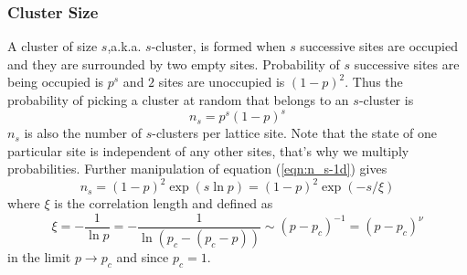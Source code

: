 		\subsubsection{Cluster Size}
		A cluster of size $s$,a.k.a. $s$-cluster, is formed when $s$ successive sites are occupied and they are surrounded by two empty sites. Probability of $s$ successive sites are being occupied is $p^s$ and $2$ sites are unoccupied is $(1-p)^2$. Thus the probability of picking a cluster at random that belongs to an $s$-cluster is
		\begin{equation}
			n_s = p^s (1-p)^s
			\label{eqn:n_s-1d}
		\end{equation}
		$n_s$ is also the number of $s$-clusters per lattice site. Note that the state of one particular site is independent of any other sites, that's why we multiply probabilities. Further manipulation of equation (\ref{eqn:n_s-1d}) gives
		\begin{equation}
			n_s = (1-p)^2 \exp (s \ln p) = (1-p)^2 \exp(-s/\xi)
		\end{equation}
		where $\xi$ is the correlation length and defined as
		\begin{equation}
			\xi = -\frac{1}{\ln p} = - \frac{1}{\ln(p_c - (p_c -p))} \sim (p-p_c)^{-1} = (p-p_c)^\nu
			\label{eqn:correlation-length-def}
		\end{equation}
		in the limit $p\rightarrow p_c$ and since $p_c=1$.
